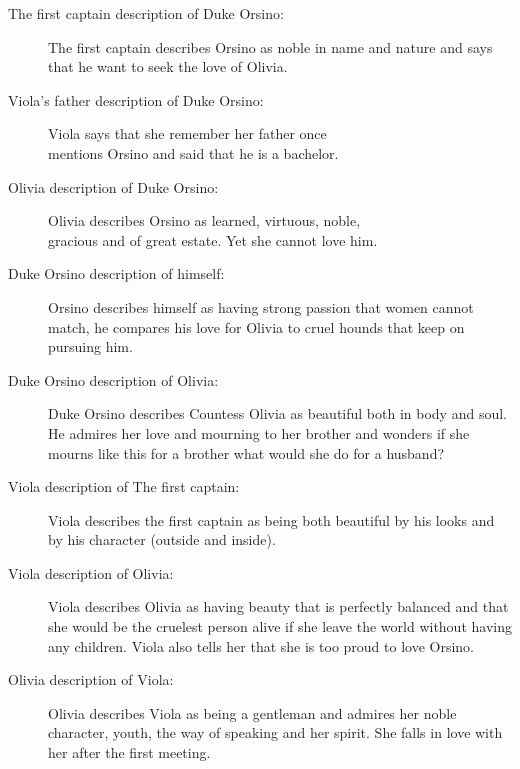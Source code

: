 \documentclass[12pt, a4paper]{article}
\begin{document}
\begin{description}
  \item[The first captain description of Duke Orsino:] The first captain describes Orsino as noble in name and nature
and says that he want to seek the love of Olivia.

  \item[Viola's father description of Duke Orsino:] Viola says that she remember her father once\\mentions Orsino and said that 
    he is a bachelor.

  \item[Olivia description of Duke Orsino:] Olivia describes Orsino as learned, virtuous, noble,\\ gracious 
    and of great estate. Yet she cannot love him.

  \item[Duke Orsino description of himself:] Orsino describes himself as having strong passion that women cannot match,
    he compares his love for Olivia to cruel hounds that keep on pursuing him.

  \item[Duke Orsino description of Olivia:] Duke Orsino describes Countess Olivia as beautiful both in body and soul.
    He admires her love and mourning to her brother and wonders if she mourns like this for a brother what
    would she do for a husband?

  \item[Viola description of The first captain:] Viola describes the first captain as
    being both beautiful by his looks and by his character (outside and inside).

  \item[Viola description of Olivia:] Viola describes Olivia as having beauty that is perfectly balanced
    and that she would be the cruelest person alive if she leave the world without having any children.
    Viola also tells her that she is too proud to love Orsino.

  \item[Olivia description of Viola:] Olivia describes Viola as being a gentleman and
    admires her noble character, youth, the way of speaking and her spirit.
    She falls in love with her after the first meeting.

\end{description}
\end{document}
